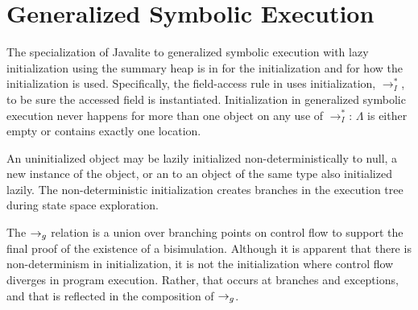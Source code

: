 \section{Generalized Symbolic Execution}
\label{app:gse}
The specialization of Javalite to generalized symbolic execution with
lazy initialization using the summary heap is in 
for the initialization and  for how the
initialization is used. Specifically, the field-access rule in
 uses initialization, $\rightarrow_I^*$, to be sure
the accessed field is instantiated. Initialization in generalized
symbolic execution never happens for more than one object on any use
of $\rightarrow_I^*$: $\Lambda$ is either empty or contains exactly one
location.

An uninitialized object may be lazily initialized
non-deterministically to null, a new instance of the object, or an to
an object of the same type also initialized lazily. The
non-deterministic initialization creates branches in the execution
tree during state space exploration. 

The $\rightarrow_{g}$ relation is a union over branching points on control flow
to support the final proof of the existence of a
bisimulation. Although it is apparent that there is non-determinism in
initialization, it is not the initialization where control flow
diverges in program execution. Rather, that occurs at branches and
exceptions, and that is reflected in the composition of $\rightarrow_{g}$.




